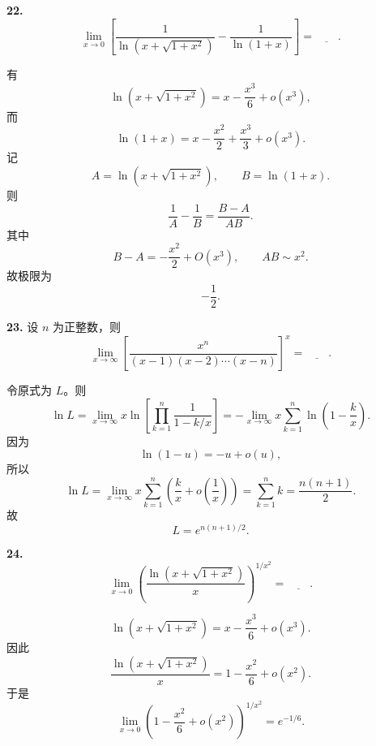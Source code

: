 \begin{problemblock}
\textbf{22.}
\[
\lim_{x\to0}
\left[
\frac1{\ln\left(x+\sqrt{1+x^2}\right)}
-\frac1{\ln(1+x)}
\right]
=\underline{\qquad}.
\]
\end{problemblock}

\begin{solutionblock}
有
\[
\ln\left(x+\sqrt{1+x^2}\right)
=x-\frac{x^3}{6}+o(x^3),
\]
而
\[
\ln(1+x)=x-\frac{x^2}{2}+\frac{x^3}{3}+o(x^3).
\]
记
\[
A=\ln\left(x+\sqrt{1+x^2}\right),\qquad B=\ln(1+x).
\]
则
\[
\frac1A-\frac1B=\frac{B-A}{AB}.
\]
其中
\[
B-A=-\frac{x^2}{2}+O(x^3),\qquad AB\sim x^2.
\]
故极限为
\[
-\frac12.
\]
\end{solutionblock}

\begin{problemblock}
\textbf{23.} 设 \(n\) 为正整数，则
\[
\lim_{x\to\infty}
\left[
\frac{x^n}{(x-1)(x-2)\cdots(x-n)}
\right]^x
=\underline{\qquad}.
\]
\end{problemblock}

\begin{solutionblock}
令原式为 \(L\)。则
\[
\ln L
=\lim_{x\to\infty}
x\ln\left[
\prod_{k=1}^n\frac1{1-k/x}
\right]
=-\lim_{x\to\infty}x\sum_{k=1}^n\ln\left(1-\frac{k}{x}\right).
\]
因为
\[
\ln(1-u)=-u+o(u),
\]
所以
\[
\ln L
=\lim_{x\to\infty}x\sum_{k=1}^n\left(\frac{k}{x}+o\left(\frac1x\right)\right)
=\sum_{k=1}^n k
=\frac{n(n+1)}2.
\]
故
\[
L=e^{n(n+1)/2}.
\]
\end{solutionblock}

\begin{problemblock}
\textbf{24.}
\[
\lim_{x\to0}
\left(
\frac{\ln\left(x+\sqrt{1+x^2}\right)}{x}
\right)^{1/x^2}
=\underline{\qquad}.
\]
\end{problemblock}

\begin{solutionblock}
\[
\ln\left(x+\sqrt{1+x^2}\right)
=x-\frac{x^3}{6}+o(x^3).
\]
因此
\[
\frac{\ln\left(x+\sqrt{1+x^2}\right)}{x}
=1-\frac{x^2}{6}+o(x^2).
\]
于是
\[
\lim_{x\to0}
\left(1-\frac{x^2}{6}+o(x^2)\right)^{1/x^2}
=e^{-1/6}.
\]
\end{solutionblock}

